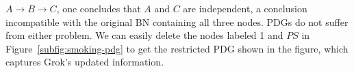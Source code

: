 \documentclass{article}
\theoremstyle{plain}
\theoremstyle{definition}
\newenvironment{example}
	{\pushQED{\qed}\renewcommand{\qedsymbol}{$\triangle$}\examplex}
	{\popQED\endexamplex%
}
\theoremstyle{remark}
\newcommand{\todo}[1]{{\color{red}\ \!\Large\smash{\textbf{[}}{\normalsize\textsc{todo:} #1}\ \!\smash{\textbf{]}}}}
\numberwithin{equation}{section}
\begin{document}
\begin{example}[restriction]
$A \rightarrow B \rightarrow C$,                
		one concludes that $A$ and $C$ are independent, a
               conclusion incompatible with the original BN
               containing all three nodes.   
%
PDGs do not suffer from either problem.  We can easily delete the
nodes labeled 1 and $PS$ in Figure~\ref{subfig:smoking-pdg} to get the
restricted PDG shown in the figure, which captures Grok's updated information.

\end{example}
\end{document}
